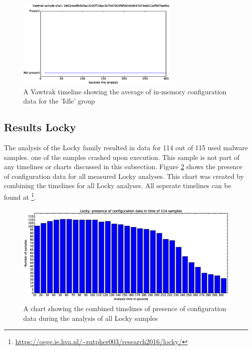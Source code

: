 \documentclass[conference]{IEEEtran}
\begin{document}
\begin{figure}[!h]
    \includegraphics[width=8cm,scale=0.5]{images/vawtrak/vawtrak-timelines-eps/Vawtrak-2463ceddfe505ec3320f728ac3b7b47002f4fb93dbd047e73de013af9876a80e.eps}
    \caption{A Vawtrak timeline showing the average of in-memory configuration data for the 'Idle' group}
    \label{fig:vawtrak-timeline-idle}
\end{figure}


\subsection{Results Locky}
The analysis of the Locky family resulted in data for 114 out of 115 used malware samples. one of the samples crashed upon execution. This sample is not part of any timelines or charts discussed in this subsection. Figure \ref{fig:locky-bar} shows the presence of \Gls{configuration data} for all measured Locky analyses. This chart was created by combining the timelines for all Locky analyses. All seperate timelines can be found at \footnote{\url{https://oege.ie.hva.nl/~zutpher003/research2016/locky/}}.\\


\begin{figure}[h]
	\hspace{-3cm}
    \includegraphics[width=13cm,trim=-70mm 0mm 0mm 9mm, clip=true]{images/locky/Locky-barchart.eps}
    \caption{A chart showing the combined timelines of presence of configuration data during the analysis of all Locky samples}
    \label{fig:locky-bar}
\end{figure}
\end{document}
